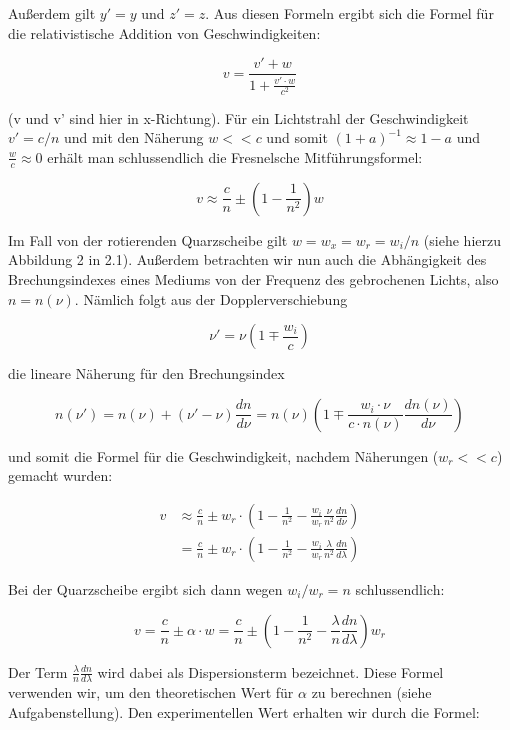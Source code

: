 Außerdem gilt $y'=y$ und $z'=z$. Aus diesen Formeln ergibt sich die Formel für die relati\-vistische Addition von Geschwindigkeiten:

\begin{equation} v = \frac{v' + w}{1 + \frac{v'\cdot w}{c^2}} \end{equation}

(v und v' sind hier in x-Richtung). Für ein Lichtstrahl der Geschwindigkeit $v' = c/n$ und mit den Näherung $w<<c$ und somit $(1+a)^{-1}\approx 1-a$ und $\frac{w}{c} \approx 0$ erhält man schlussendlich die Fresnelsche Mitführungsformel:

\begin{equation} v\approx \frac{c}{n} \pm \left(1-\frac{1}{n^2}\right)w \end{equation}

Im Fall von der rotierenden Quarzscheibe gilt $w = w_x = w_r = w_i / n$  (siehe hierzu Abbildung 2 in 2.1). Außerdem betrachten wir nun auch die Abhängigkeit des Brechungsindexes eines Mediums von der Frequenz des gebrochenen Lichts, also $n = n(\nu)$. Nämlich folgt aus der Dopplerverschiebung

$$\nu' = \nu\left( 1\mp \frac{w_i}{c}\right)$$

die lineare Näherung für den Brechungsindex

$$n(\nu') = n(\nu) + (\nu' - \nu)\frac{dn}{d\nu} = n(\nu)\left(1 \mp \frac{w_i\cdot\nu}{c\cdot n(\nu)}\frac{dn(\nu)}{d\nu} \right)$$

und somit die Formel für die Geschwindigkeit, nachdem Näherungen ($w_r << c$) gemacht wurden:

\begin{align} 
v & \approx \frac{c}{n} \pm w_r\cdot\left(1 - \frac{1}{n^2} - \frac{w_i}{w_r}\frac{\nu}{n^2}\frac{dn}{d\nu} \right)\\
& = \frac{c}{n} \pm w_r\cdot\left(1 - \frac{1}{n^2} - \frac{w_i}{w_r}\frac{\lambda}{n^2}\frac{dn}{d\lambda} \right)
\end{align}

Bei der Quarzscheibe ergibt sich dann wegen $w_i / w_r = n$ schlussendlich:

\begin{equation}
\boxed{v = \frac{c}{n} \pm \alpha\cdot w = \frac{c}{n} \pm \left(1 - \frac{1}{n^2} - \frac{\lambda}{n}\frac{dn}{d\lambda} \right)w_r}
\end{equation}

Der Term $\frac{\lambda}{n}\frac{dn}{d\lambda}$ wird dabei als Dispersionsterm bezeichnet. Diese Formel verwenden wir, um den theoretischen Wert für $\alpha$ zu berechnen (siehe Aufgabenstellung). Den experimentellen Wert erhalten wir durch die Formel:

